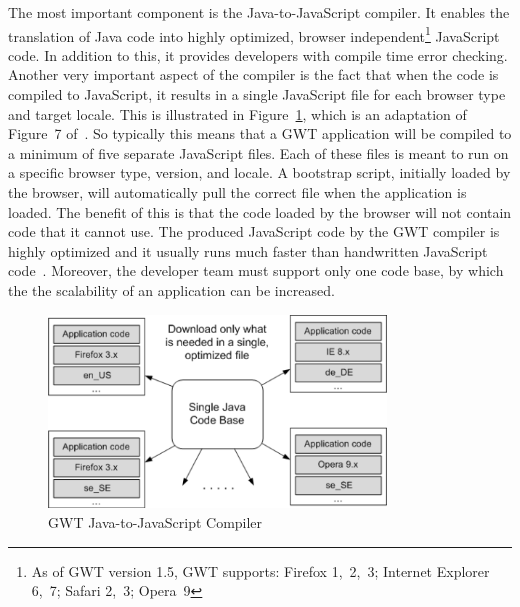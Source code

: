 The most important component is the Java-to-JavaScript compiler. It enables the 
translation of Java code into highly optimized, browser 
independent\footnote{As of GWT version 1.5, GWT supports: 
Firefox 1,~2,~3; Internet Explorer 6,~7; Safari 2,~3; Opera~9}
JavaScript code. 
In addition to this, it provides developers with compile time error checking. 
Another very important
aspect of the compiler is the fact that when the code is compiled to JavaScript,
it results in 
a single JavaScript file for each browser type and target locale. This is illustrated 
in Figure~\ref{fig:gwt01}, which is an adaptation of Figure~7 of~\cite{wgio2}. 
So typically this means that a GWT application will be compiled to 
a minimum of five separate JavaScript files. Each of these files is meant to run 
on a specific browser type, version, and locale. A bootstrap script, initially 
loaded by the browser, will 
automatically pull the correct file when the
application is loaded. The benefit of this is that the code loaded by the browser 
will not contain code that it cannot use. The produced JavaScript code by the GWT 
compiler is highly optimized and it usually runs much faster than handwritten 
JavaScript code~\cite{wgio1}. Moreover, the developer team must support only
one code base, by which the the scalability of an application can be increased.  

\begin{figure}[h]
	\begin{center}
		\includegraphics[width=0.8\textwidth]{./img/gwt01a.png}
		\caption{GWT Java-to-JavaScript Compiler}
		\label{fig:gwt01}
	\end{center}
\end{figure}

